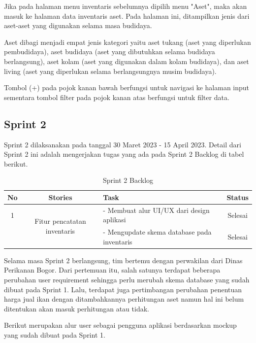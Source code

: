 \begin{spacing}{1.5}
	Jika pada halaman menu inventaris sebelumnya dipilih menu "Aset", maka akan masuk ke halaman data inventaris aset. Pada halaman ini, ditampilkan jenis dari aset-aset yang digunakan selama masa budidaya.
	
	Aset dibagi menjadi empat jenis kategori yaitu aset tukang (aset yang diperlukan pembudidaya), aset budidaya (aset yang dibutuhkan selama budidaya berlangsung), aset kolam (aset yang digunakan dalam kolam budidaya), dan aset living (aset yang diperlukan selama berlangsungnya musim budidaya).

	Tombol (+) pada pojok kanan bawah berfungsi untuk navigasi ke halaman input sementara tombol filter pada pojok kanan atas berfungsi untuk filter data.

\subsection{Sprint 2}


Sprint 2 dilaksanakan pada tanggal 30 Maret 2023 - 15 April 2023. Detail dari Sprint 2 ini adalah mengerjakan tugas yang ada pada Sprint 2 Backlog di tabel berikut.
		
	\begin{table}[H]	
		\begin{center}
			\caption{Sprint 2 Backlog}
			\label{tab:table7}
			\begin{tabular}{|c|c|m{13em}|c|}
			\hline
			\textbf{No} & \textbf{Stories} & \textbf{Task} & \textbf{Status} \\
			\hline
			1 & \multirow{2}{12em}{Fitur pencatatan inventaris} & - Membuat alur UI/UX dari design aplikasi & Selesai \\
			&  & - Mengupdate skema database pada inventaris & Selesai \\ 
			\hline
			\end{tabular}
		\end{center}
	\end{table}

	Selama masa Sprint 2 berlangsung, tim bertemu dengan perwakilan dari Dinas Perikanan Bogor. Dari pertemuan itu, salah satunya terdapat beberapa perubahan user requirement sehingga perlu merubah skema database yang sudah dibuat pada Sprint 1. Lalu, terdapat juga pertimbangan perubahan penentuan harga jual ikan dengan ditambahkannya perhitungan aset namun hal ini belum ditentukan akan masuk perhitungan atau tidak. 

	Berikut merupakan alur user sebagai pengguna aplikasi berdasarkan mockup yang sudah dibuat pada Sprint 1.


\end{spacing}
